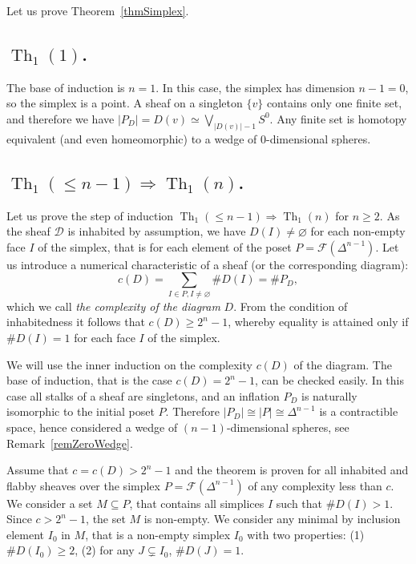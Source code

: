 \documentclass[english,12pt,oneside]{amsproc}
\DeclareMathOperator{\Th}{Th}
\newcommand{\ca}[1]{\mathcal{#1}}
\numberwithin{equation}{section}
\theoremstyle{plain}
\theoremstyle{definition}
\theoremstyle{remark}
\begin{document}
Let us prove Theorem~\ref{thmSimplex}.

\subsection{$\Th_1(1)$.}

The base of induction is $n=1$. In this case, the simplex has dimension $n-1=0$, so the simplex is a point. A sheaf on a singleton $\{v\}$ contains only one finite set,  and  therefore we have $|P_D|=D(v)\simeq \bigvee_{|D(v)|-1}S^0$. Any finite set is homotopy equivalent (and even homeomorphic) to a wedge of $0$-dimensional spheres.

\subsection{$\Th_1(\leqslant n-1)\Rightarrow\Th_1(n)$.}

Let us prove the step of induction $\Th_1(\leqslant n-1)\Rightarrow \Th_1(n)$ for $n\geqslant 2$. As the sheaf $\ca{D}$ is inhabited by assumption, we have $D(I)\neq\varnothing$ for each non-empty face $I$ of the simplex, that is for each element of the poset $P=\ca{F}(\Delta^{n-1})$. Let us introduce a numerical characteristic of a sheaf (or the corresponding diagram):
\[
c(D)=\sum_{I\in P, I\neq \varnothing}\#D(I)=\#P_D,
\]
which we call \emph{the complexity of the diagram} $D$. From the condition of inhabitedness it follows that $c(D)\geqslant 2^n-1$, whereby equality is attained only if $\#D(I)=1$ for each face $I$ of the simplex.

We will use the inner induction on the complexity $c(D)$ of the diagram. The base of induction, that is the case $c(D)=2^n-1$, can be checked easily. In this case all stalks of a sheaf are singletons,  and  an inflation $P_D$ is naturally isomorphic to the initial poset $P$. Therefore $|P_D|\cong |P|\cong \Delta^{n-1}$ is a contractible space, hence considered a wedge of $(n-1)$-dimensional spheres, see Remark~\ref{remZeroWedge}.

Assume that $c=c(D)>2^n-1$ and the theorem is proven for all inhabited and flabby sheaves over the simplex $P=\ca{F}(\Delta^{n-1})$ of any complexity less than $c$. We consider a set $M\subseteq P$, that contains all simplices $I$ such that $\#D(I)>1$. Since $c>2^n-1$, the set $M$ is non-empty. We consider any minimal by inclusion element $I_0$ in $M$, that is a non-empty simplex $I_0$ with two properties: (1) $\#D(I_0)\geqslant 2$, (2) for any $J\subsetneq I_0$,  $\#D(J)=1$.
\end{document}
